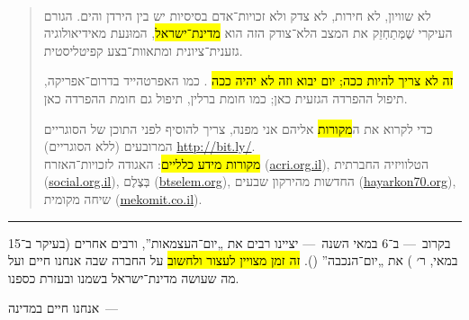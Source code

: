 \\

\begin{quote}
לא שוויון, לא חירות, לא צדק ולא זכויות־אדם בסיסיות יש בין הירדן והים. הגורם העיקרי שֶׁמְּתַחְזֵק את המצב הלא־צודק הזה הוא \hl{מדינת־ישראל}, המוּנעת מאידיאולוגיה גזענית־ציונית ומתאוות־בצע קפיטליסטית.

\hl{זה לא צריך להיות ככה; יום יבוא וזה לא יהיה ככה }. כמו האפרטהייד בדרום־אפריקה, תיפול ההפרדה הגזעית כאן; כמו חומת ברלין, תיפול גם חומת ההפרדה כאן.


{\small כדי לקרוא את ה\hl{מקורות} אליהם אני מפנה, צריך להוסיף לפני התוכן של הסוגריים המרובעים (ללא הסוגריים) {\mbox{\url{http://bit.ly/}}}.\\
\hl{מקורות מידע כלליים}: האגודה לזכויות־האזרח (\mbox{\url{acri.org.il}}), הטלוויזיה החברתית (\mbox{\url{social.org.il}}), בְּצֶלֶם (\mbox{\url{btselem.org}}), החדשות מהירקון שבעים (\mbox{\url{hayarkon70.org}}), שיחה מקומית (\mbox{\url{mekomit.co.il}}).}
\end{quote}

\hrule

בקרוב~— ב־6 במאי השנה~— יציינו רבים את „יום־העצמ{\small א}ות”, ורבים אחרים (בעיקר ב־15 במאי, ר׳ ) את „יום־הנכבה” (). \hl{זה זמן מצויין לעצור ולחשוב} על החברה שבה אנחנו חיים ועל מה שעושה מדינת־ישראל בשמנו ובעזרת כספנו.

{\setlength\parindent{-0.5em}\Large אנחנו חיים במדינה~—}

